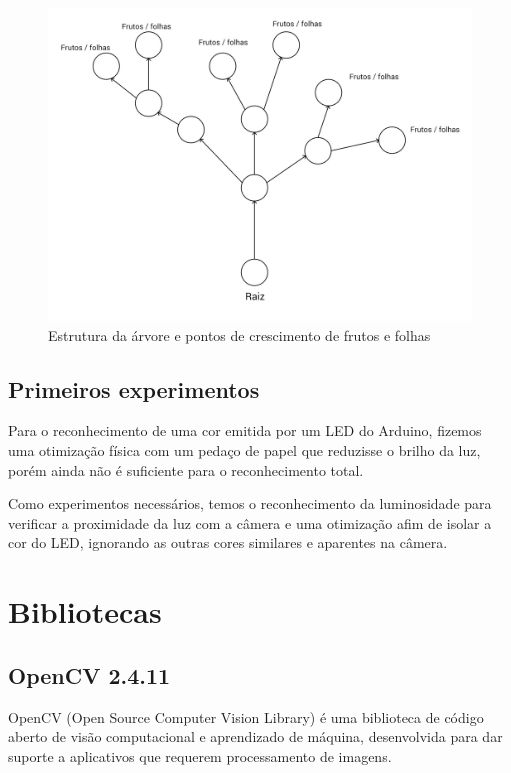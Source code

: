 \documentclass[12pt]{article}
\begin{document}
	\begin{figure}[ht!]
	\begin{center}
		\includegraphics[scale=0.15]{img/PI3_Arvore.png}
		\footnotesize \caption{Estrutura da \'arvore e pontos de crescimento de frutos e folhas }
	\end{center}
	\end{figure}	

\subsection{Primeiros experimentos}
Para o reconhecimento de uma cor emitida por um LED do Arduino, fizemos uma otimiza\c c\~ao f\'isica
com um peda\c co de papel que reduzisse o brilho da luz, por\'em ainda n\~ao \'e suficiente para
o reconhecimento total.

Como experimentos necess\'arios, temos o reconhecimento da luminosidade para verificar
a proximidade da luz com a c\^amera e uma otimiza\c c\~ao afim de isolar a cor do LED,
ignorando as outras cores similares e aparentes na c\^amera.

\section{Bibliotecas}
\subsection{OpenCV 2.4.11}
OpenCV (Open Source Computer Vision Library)
\'e uma biblioteca de c\'odigo aberto de vis\~ao computacional e aprendizado de m\'aquina,
desenvolvida para dar suporte a aplicativos que requerem processamento de imagens.
  
\end{document}
